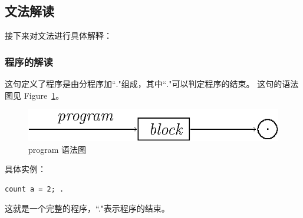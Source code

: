 \subsection{文法解读}
接下来对文法进行具体解释：
\subsubsection{程序的解读}

这句定义了程序是由分程序加``$.$"组成，其中``$.$"可以判定程序的结束。
这句的语法图见 Figure~\ref{program}。
\begin{figure}[h]
\begin{center}
    \includegraphics[scale=1]{Figures/program.eps}
\end{center}
\caption{program 语法图}
\label{program}
\end{figure}
具体实例：
\begin{verbatim}
count a = 2; .
\end{verbatim}
这就是一个完整的程序，``."表示程序的结束。
